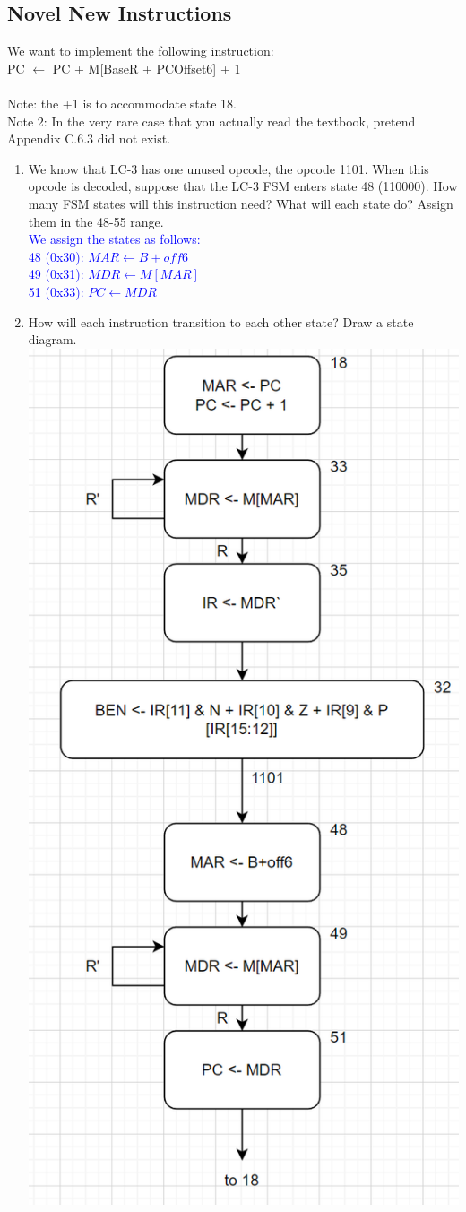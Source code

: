 \documentclass{article}
\begin{document}
\begin{enumerate}[label=(\alph*)]
    \newpage
   \section{Novel New Instructions}
    We want to implement the following instruction: \\
    PC $\longleftarrow$ PC + M[BaseR + PCOffset6] + 1 \\\\
    Note: the +1 is to accommodate state 18. \\
    Note 2: In the very rare case that you actually read the textbook, pretend Appendix C.6.3 did not exist.\\
    \begin{enumerate}[label=(\alph*),itemsep = 20pt]
        \item We know that LC-3 has one unused opcode, the opcode 1101. When this opcode is decoded, suppose that the LC-3 FSM enters state 48 (110000). How many FSM states will this instruction need? What will each state do? Assign them in the 48-55 range.\\
        \textcolor{blue}{
        We assign the states as follows: \\
        48 (0x30): $MAR \longleftarrow B + off6$\\
        49 (0x31): $MDR \longleftarrow M[MAR]$ \\
        51 (0x33): $PC \longleftarrow MDR$ \\
        }
        
        \item How will each instruction transition to each other state? Draw a state diagram.
        \\
        \includegraphics[width=0.4\linewidth]{figures/newinstr-sol-b.png}


\end{enumerate}
\end{enumerate}
\end{document}
